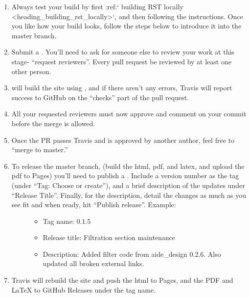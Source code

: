 \documentclass[letterpaper,10pt,english]{sphinxmanual}
\begin{document}
\begin{enumerate}
\item {} 
Always test your build by first :ref:{}` building RST locally \textless{}heading\_building\_rst\_locally\textgreater{}{}`, and then following the {\hyperref[\detokenize{Textbook_Creation_Help/rst_intro:heading-testing-online}]{}} instructions. Once you like how your build looks, follow the steps below to introduce it into the master branch.

\item {} 
Submit a . You’ll need to ask for someone else to review your work at this stage- “request reviewers”. Every pull request  be reviewed by at least one other person.

\item {} 
 will build the site using , and if there aren’t any errors, Travis will report success to GitHub on the “checks” part of the pull request.

\item {} 
All your requested reviewers must now approve and comment on  your commit before the merge is allowed.

\item {} 
Once the PR passes Travis and is approved by another author, feel free to “merge to master.”

\item {} \begin{description}
\item[{To release the master branch, (build the html, pdf, and latex, and upload the pdf to Pages) you’ll need to publish a . Include a  version number as the tag (under “Tag: Choose or create”), and a brief description of the updates under “Release Title”. Finally, for the description, detail the changes as much as you see fit and when ready, hit “Publish release”. Example:}] \leavevmode\begin{itemize}
\item {} 
Tag name: 0.1.5

\item {} 
Release title: Filtration section maintenance

\item {} 
Description: Added filter code from aide\_design 0.2.6. Also updated all broken external links.

\end{itemize}

\end{description}

\item {} 
Travis will rebuild the site and push the html to Pages, and the PDF and LaTeX to GitHub Releases under the tag name.

\end{enumerate}
\end{document}
